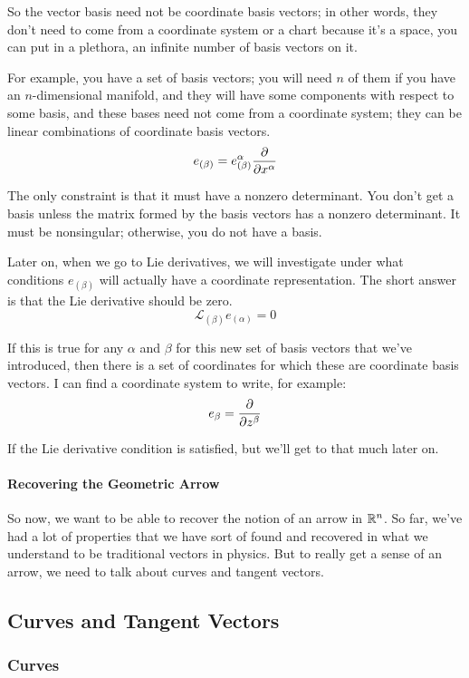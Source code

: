		So the vector basis need not be coordinate basis vectors; in other words, they don't need to come from a coordinate system or a chart
		because it's a space, you can put in a plethora, an infinite number of basis vectors on it.

		For example, you have a set of basis vectors; you will need $n$ of them if you have an $n$-dimensional manifold, and
		they will have some components with respect to some basis, and these bases need not come from
		a coordinate system; they can be linear combinations of coordinate basis vectors.
		\[
			e_{(\beta)} = e_{(\beta)}^\alpha \pdv{}{x^\alpha} 
		\]

		The only constraint is
		that it must have a nonzero determinant. You don't get a basis unless the matrix formed by the basis vectors
		has a nonzero determinant. It must be nonsingular; otherwise, you do not have a basis.

		Later on, when we go to Lie derivatives, we will investigate under what conditions $e_{(\beta)}$ will actually have a coordinate representation.
		The short answer is that the Lie derivative should be zero.
		\[
			\mathscr{L}_{(\beta)} e_{(\alpha)} = 0
		\]

		If this is true for any $\alpha$ and $\beta$ for this new set of basis vectors that we've introduced, then
		there is a set of coordinates for which these are coordinate basis vectors. I can find a coordinate system to write,
		for example:
		\[
			e_{\beta} = \pdv{}{z^\beta} 
		\]

		If the Lie derivative condition is satisfied, but we'll get to that much later on.
\newpage
	\paragraph{Recovering the Geometric Arrow}

		So now, we want to be able to recover the notion of an arrow in $\mathbb{R}^n$. So far, we've had a lot of properties
		that we have sort of found and recovered in what we understand to be traditional vectors in physics. But to really get
		a sense of an arrow, we need to talk about curves and tangent vectors.

\subsection{Curves and Tangent Vectors}
	\subsubsection{Curves}

